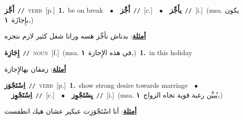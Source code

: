 \documentclass[10pt,a4paper,twoside]{article} %
\begin{document}
\begin{multicols}{2}
{\setlength\topsep{0pt}\textbf{\foreignlanguage{arabic}{أَجَّز}}\ {\color{gray}\texttt{//}\color{black}}\ \textsc{verb}\ [p.]\ \textbf{1.}~be on break\ \ $\bullet$\ \ \setlength\topsep{0pt}\textbf{\foreignlanguage{arabic}{أَجِّز}}\ {\color{gray}\texttt{//}\color{black}}\ [c.]\ \ $\bullet$\ \ \setlength\topsep{0pt}\textbf{\foreignlanguage{arabic}{يأَجِّز}}\ {\color{gray}\texttt{//}\color{black}}\ [i.]\ \color{gray}(msa. \foreignlanguage{arabic}{يكون بإِجازَة}~\foreignlanguage{arabic}{\textbf{١.}})\color{black}\  \begin{flushright}\color{gray}\foreignlanguage{arabic}{\textbf{\underline{\foreignlanguage{arabic}{أمثلة}}}: بدناش نأجِّز هسه ورانا شغل كثير لازم ننجزه}\end{flushright}\color{black}} \vspace{2mm}

{\setlength\topsep{0pt}\textbf{\foreignlanguage{arabic}{إِجَازِة}}\ {\color{gray}\texttt{//}\color{black}}\ \textsc{noun}\ [f.]\ \color{gray}(msa. \foreignlanguage{arabic}{في هذه الإِجازة}~\foreignlanguage{arabic}{\textbf{١.}})\color{black}\ \textbf{1.}~in this holiday\  \begin{flushright}\color{gray}\foreignlanguage{arabic}{\textbf{\underline{\foreignlanguage{arabic}{أمثلة}}}: زمقان بهالإِجازة}\end{flushright}\color{black}} \vspace{2mm}

{\setlength\topsep{0pt}\textbf{\foreignlanguage{arabic}{اِسْتَجْوَز}}\ {\color{gray}\texttt{//}\color{black}}\ \textsc{verb}\ [p.]\ \textbf{1.}~show strong desire towards marriage\ \ $\bullet$\ \ \setlength\topsep{0pt}\textbf{\foreignlanguage{arabic}{اِسْتَجْوِز}}\ {\color{gray}\texttt{//}\color{black}}\ [c.]\ \ $\bullet$\ \ \setlength\topsep{0pt}\textbf{\foreignlanguage{arabic}{يِسْتَجْوِز}}\ {\color{gray}\texttt{//}\color{black}}\ [i.]\ \color{gray}(msa. \foreignlanguage{arabic}{يُبيِّن رغبة قوية تجاه الزواج}~\foreignlanguage{arabic}{\textbf{١.}})\color{black}\  \begin{flushright}\color{gray}\foreignlanguage{arabic}{\textbf{\underline{\foreignlanguage{arabic}{أمثلة}}}: أنا اسْتَجْوَزِت عبكير عشان هيك انطفست}\end{flushright}\color{black}} \vspace{2mm}


\end{multicols}
\end{document}
